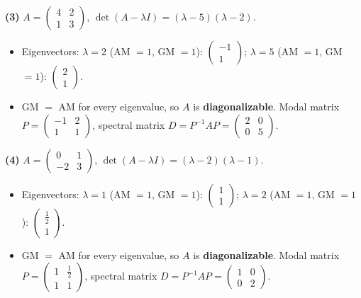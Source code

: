 \noindent\textbf{(3)} $A=\begin{pmatrix}4 & 2 \\ 1 & 3\end{pmatrix}$, $\det(A-\lambda I)=\left(\lambda - 5\right) \left(\lambda - 2\right)$.
\begin{itemize}\item Eigenvectors: $\lambda=2$ (AM $=1$, GM $=1$): $\begin{pmatrix}-1 \\ 1\end{pmatrix}$; $\lambda=5$ (AM $=1$, GM $=1$): $\begin{pmatrix}2 \\ 1\end{pmatrix}$.
\item GM $=$ AM for every eigenvalue, so $A$ is \textbf{diagonalizable}. Modal matrix $P=\begin{pmatrix}-1 & 2 \\ 1 & 1\end{pmatrix}$, spectral matrix $D=P^{-1}AP=\begin{pmatrix}2 & 0 \\ 0 & 5\end{pmatrix}$.\end{itemize}

\noindent\textbf{(4)} $A=\begin{pmatrix}0 & 1 \\ -2 & 3\end{pmatrix}$, $\det(A-\lambda I)=\left(\lambda - 2\right) \left(\lambda - 1\right)$.
\begin{itemize}\item Eigenvectors: $\lambda=1$ (AM $=1$, GM $=1$): $\begin{pmatrix}1 \\ 1\end{pmatrix}$; $\lambda=2$ (AM $=1$, GM $=1$): $\begin{pmatrix}\frac{1}{2} \\ 1\end{pmatrix}$.
\item GM $=$ AM for every eigenvalue, so $A$ is \textbf{diagonalizable}. Modal matrix $P=\begin{pmatrix}1 & \frac{1}{2} \\ 1 & 1\end{pmatrix}$, spectral matrix $D=P^{-1}AP=\begin{pmatrix}1 & 0 \\ 0 & 2\end{pmatrix}$.\end{itemize}

